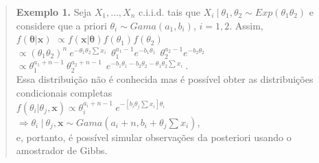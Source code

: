 \documentclass[
]{book}
\begin{document}
\begin{quote}
\textbf{Exemplo 1.} Seja \(X_1,\ldots,X_n\) c.i.i.d. tais que \(X_i~|~\theta_1,\theta_2 \sim \textit{Exp}\left(\theta_1\theta_2\right)\) e considere que a priori \(\theta_i \sim \textit{Gama}\left(a_1,b_i\right)\), \(i=1,2\). Assim,\\
\(f(\boldsymbol \theta|\boldsymbol x)\)
\(\propto f(\boldsymbol x|\boldsymbol \theta) f(\theta_1)f(\theta_2)\)
\(\propto (\theta_1 \theta_2)^n~e^{-\theta_1\theta_2\sum x_i}~~\theta_1^{a_1-1}e^{-b_1\theta_1}~~\theta_2^{a_2-1}e^{-b_2\theta_2}\)
\(\propto \theta_1^{a_1+n-1}~\theta_2^{a_2+n-1}~~e^{-b_1\theta_1-b_2\theta_2 -\theta_1\theta_2\sum x_i}~.\)\\
Essa distribuição não é conhecida mas é possível obter as distribuições condicionais completas\\
\(f(\theta_i|\theta_j,\boldsymbol x) \propto \theta_i^{a_i+n-1}~e^{-\left[b_i \theta_j\sum x_i\right]\theta_i}\) \(\Longrightarrow \theta_i~|~\theta_j,\boldsymbol x \sim \textit{Gama}\left(a_i+n,b_i+\theta_j\sum x_i\right)\),\\
e, portanto, é possível simular observações da posteriori usando o amostrador de Gibbs.
\end{quote}
\end{document}
